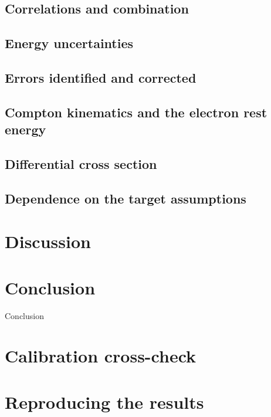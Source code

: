 \documentclass[aps,pra,reprint,superscriptaddress,nofootinbib,floatfix]{revtex4-2}
\begin{document}

\subsection{Correlations and combination}


\subsection{Energy uncertainties}


\subsection{Errors identified and corrected}
\label{sec:errors}


\subsection{Compton kinematics and the electron rest energy}
\label{sec:kin}


\subsection{Differential cross section}


\subsection{Dependence on the target assumptions}
\label{sec:norm}


\section{Discussion}
\label{sec:discussion}


\section{Conclusion}
\label{sec:conclusion}

Conclusion

\appendix

\section{Calibration cross-check}
\label{app:calcheck}


\section{Reproducing the results}
\label{app:code}



\end{document}
